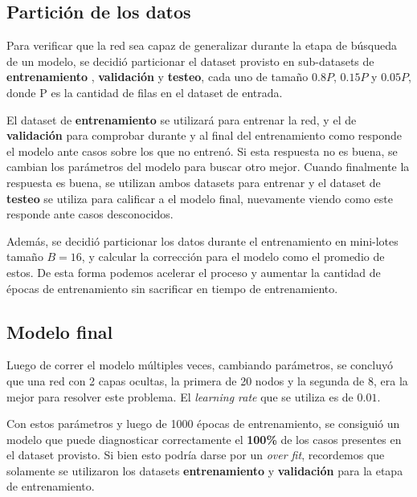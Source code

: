 \documentclass[a4paper,10pt]{article}
\begin{document}
\subsection{Partición de los datos}

Para verificar que la red sea capaz de generalizar durante la etapa de
búsqueda de un modelo, se decidió particionar el dataset provisto en
sub-datasets de \textbf{entrenamiento} , \textbf{validación} y
\textbf{testeo}, cada uno de tamaño $0.8P$, $0.15P$ y $0.05P$, donde P es la
cantidad de filas en el dataset de entrada.

El dataset de \textbf{entrenamiento} se utilizará para entrenar la red, y el de
\textbf{validación} para comprobar durante y al final del entrenamiento como responde el
modelo ante casos sobre los que no entrenó. Si esta respuesta no es buena, se
cambian los parámetros del modelo para buscar otro mejor. Cuando finalmente la
respuesta es buena, se utilizan ambos datasets para entrenar y el dataset de
\textbf{testeo} se utiliza para calificar a el modelo final, nuevamente viendo
como este responde ante casos desconocidos.

Además, se decidió particionar los datos durante el entrenamiento en
mini-lotes tamaño $B=16$, y calcular la corrección para el modelo como el
promedio de estos. De esta forma podemos acelerar el proceso y aumentar la
cantidad de épocas de entrenamiento sin sacrificar en tiempo de entrenamiento.

\subsection{Modelo final}

Luego de correr el modelo múltiples veces, cambiando parámetros, se concluyó
que una red con 2 capas ocultas, la primera de 20 nodos y la segunda de 8, era
la mejor para resolver este problema. El \textit{learning rate} que se utiliza
es de $0.01$.

Con estos parámetros y luego de 1000 épocas de entrenamiento, se
consiguió un modelo que puede diagnosticar correctamente el \textbf{100\%}
de los casos presentes en el dataset provisto. Si bien esto podría darse por
un \textit{over fit}, recordemos que solamente se utilizaron los datasets
\textbf{entrenamiento} y \textbf{validación} para la etapa de entrenamiento.
\end{document}
